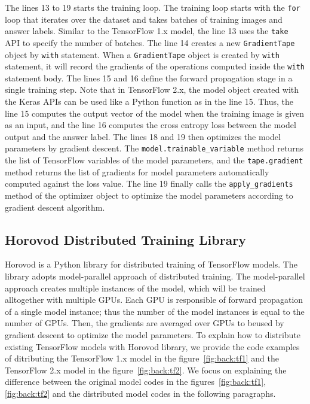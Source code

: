 The lines 13 to 19 starts the training loop.
The training loop starts with the {\tt for} loop that iterates over the dataset
and takes batches of training images and answer labels.
Similar to the TensorFlow 1.x model,
the line 13 uses the {\tt take} API to specify the number of batches.
The line 14 creates a new {\tt GradientTape} object by {\tt with} statement.
When a {\tt GradientTape} object is created by {\tt with} statement,
it will record the gradients of the operations computed inside the {\tt with}
statement body.
The lines 15 and 16 define the forward propagation stage in a single
training step.
Note that in TensorFlow 2.x, the model object created with the Keras APIs can be
used like a Python function as in the line 15.
Thus, the line 15 computes the output vector of the model when the
training image is given as an input,
and the line 16 computes the cross entropy loss between the model output and
the answer label.
The lines 18 and 19 then optimizes the model parameters by gradient descent. 
The {\tt model.trainable\_variable} method returns the list of 
TensorFlow variables of the model parameters,
and the {\tt tape.gradient} method returns the list of
gradients for model parameters automatically computed against the
loss value.
The line 19 finally calls the {\tt apply\_gradients} method of the optimizer
object to optimize the model parameters according to gradient descent algorithm.


\subsection{Horovod Distributed Training Library}

Horovod is a Python library for distributed training of TensorFlow models.
The library adopts model-parallel approach of distributed training.
The model-parallel approach creates multiple instances of the model,
which will be trained alltogether with multiple GPUs.
Each GPU is responsible of forward propagation of a single model instance;
thus the number of the model instances is equal to the number of GPUs.
Then, the gradients are averaged over GPUs to beused by gradient descent
to optimize the model parameters. 
To explain how to distribute existing TensorFlow models with Horovod library,
we provide the code examples of ditributing 
the TensorFlow 1.x model in the figure~\ref{fig:back:tf1} and the TensorFlow
2.x model in the figure~\ref{fig:back:tf2}.
We focus on explaining the difference between the original model codes in
the figures~\ref{fig:back:tf1}, \ref{fig:back:tf2} and the distributed 
model codes in the following paragraphs.

